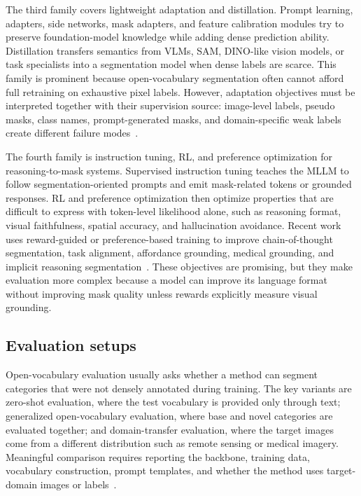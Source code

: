 The third family covers lightweight adaptation and distillation. Prompt learning, adapters, side networks, mask adapters, and feature calibration modules try to preserve foundation-model knowledge while adding dense prediction ability. Distillation transfers semantics from VLMs, SAM, DINO-like vision models, or task specialists into a segmentation model when dense labels are scarce. This family is prominent because open-vocabulary segmentation often cannot afford full retraining on exhaustive pixel labels. However, adaptation objectives must be interpreted together with their supervision source: image-level labels, pseudo masks, class names, prompt-generated masks, and domain-specific weak labels create different failure modes~\citep{xu2023san,shinhOpenvocabularySemanticSegmentation2024,libExploringEfficientOpenvocabulary2026}.

The fourth family is instruction tuning, RL, and preference optimization for reasoning-to-mask systems. Supervised instruction tuning teaches the MLLM to follow segmentation-oriented prompts and emit mask-related tokens or grounded responses. RL and preference optimization then optimize properties that are difficult to express with token-level likelihood alone, such as reasoning format, visual faithfulness, spatial accuracy, and hallucination avoidance. Recent work uses reward-guided or preference-based training to improve chain-of-thought segmentation, task alignment, affordance grounding, medical grounding, and implicit reasoning segmentation~\citep{yanTaskPreferenceOptimization2025,zhuLensLearningSegment2026,zhouReasoningImplicitSelfsupervised2026,yanMedreasonerReinforcementLearning2026,wangAffordancer1ReinforcementLearning2026}. These objectives are promising, but they make evaluation more complex because a model can improve its language format without improving mask quality unless rewards explicitly measure visual grounding.

\subsection{Evaluation setups}

Open-vocabulary evaluation usually asks whether a method can segment categories that were not densely annotated during training. The key variants are zero-shot evaluation, where the test vocabulary is provided only through text; generalized open-vocabulary evaluation, where base and novel categories are evaluated together; and domain-transfer evaluation, where the target images come from a different distribution such as remote sensing or medical imagery. Meaningful comparison requires reporting the backbone, training data, vocabulary construction, prompt templates, and whether the method uses target-domain images or labels~\citep{hhuangRenovatingNamesOpenvocabulary2024,libExploringEfficientOpenvocabulary2026}.

